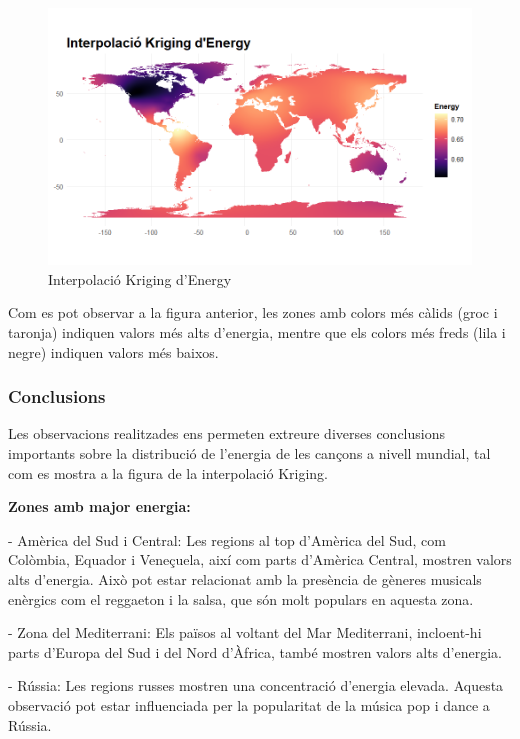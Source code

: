 \begin{figure}[h!]
    \centering
    \includegraphics[width=0.95\linewidth]{interpolacio_energy.png}
    \caption{Interpolació Kriging d'Energy}
    \label{fig:interpolacio_energy}
\end{figure}

Com es pot observar a la figura anterior, les zones amb colors més càlids (groc i taronja) indiquen valors més alts d'energia, mentre que els colors més freds (lila i negre) indiquen valors més baixos.

\subsubsection{Conclusions}

Les observacions realitzades ens permeten extreure diverses conclusions importants sobre la distribució de l'energia de les cançons a nivell mundial, tal com es mostra a la figura de la interpolació Kriging.

\textbf{Zones amb major energia:}

- Amèrica del Sud i Central:
Les regions al top d'Amèrica del Sud, com Colòmbia, Equador i Veneçuela, així com parts d'Amèrica Central, mostren valors alts d'energia. Això pot estar relacionat amb la presència de gèneres musicals enèrgics com el reggaeton i la salsa, que són molt populars en aquesta zona.

- Zona del Mediterrani: 
Els països al voltant del Mar Mediterrani, incloent-hi parts d'Europa del Sud i del Nord d'Àfrica, també mostren valors alts d'energia.

- Rússia:
Les regions russes mostren una concentració d'energia elevada. Aquesta observació pot estar influenciada per la popularitat de la música pop i dance a Rússia.


